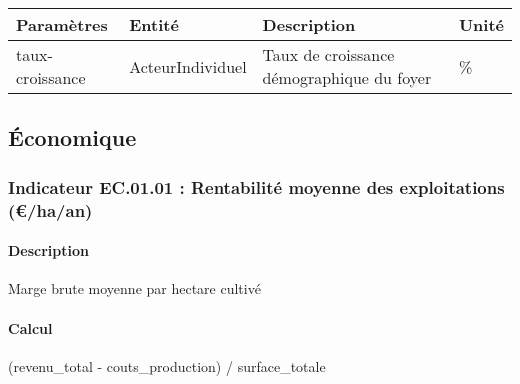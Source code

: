 \documentclass[
]{article}
\newenvironment{Shaded}{\begin{snugshade}}{\end{snugshade}}
\newcommand{\NormalTok}[1]{#1}
\begin{document}
\begin{longtable}[]{@{}
  >{\raggedright\arraybackslash}p{}
  >{\raggedright\arraybackslash}p{}
  >{\raggedright\arraybackslash}p{}
  >{\raggedright\arraybackslash}p{}@{}}
\toprule\noalign{}
\begin{minipage}[b]{\linewidth}\raggedright
\textbf{Paramètres}
\end{minipage} & \begin{minipage}[b]{\linewidth}\raggedright
\textbf{Entité}
\end{minipage} & \begin{minipage}[b]{\linewidth}\raggedright
\textbf{Description}
\end{minipage} & \begin{minipage}[b]{\linewidth}\raggedright
\textbf{Unité}
\end{minipage} \\
\midrule\noalign{}
\endhead
\bottomrule\noalign{}
\endlastfoot
taux-croissance & ActeurIndividuel & Taux de croissance démographique du
foyer & \% \\
\end{longtable}

\subsection{Économique}\label{uxe9conomique}

\subsubsection{Indicateur EC.01.01 : Rentabilité moyenne des
exploitations
(€/ha/an)}\label{indicateur-ec.01.01-rentabilituxe9-moyenne-des-exploitations-haan}

\paragraph{Description}\label{description-19}

Marge brute moyenne par hectare cultivé

\paragraph{Calcul}\label{calcul-19}

\begin{Shaded}
\begin{Highlighting}[]
\NormalTok{(revenu\_total {-} couts\_production) / surface\_totale}
\end{Highlighting}
\end{Shaded}
\end{document}
